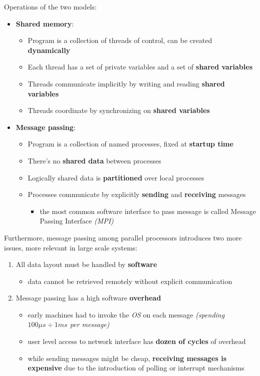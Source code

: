 \documentclass[english]{article}
\begin{document}
\bigskip
Operations of the two models:

\begin{itemize}
  \item \textbf{Shared memory}:
        \begin{itemize}
          \item Program is a collection of threads of control, can be created \textbf{dynamically}
          \item Each thread has a set of private variables and a set of \textbf{shared variables}
          \item Threads communicate implicitly by writing and reading \textbf{shared variables}
          \item Threads coordinate by synchronizing on \textbf{shared variables}
        \end{itemize}
  \item \textbf{Message passing}:
        \begin{itemize}
          \item Program is a collection of named processes, fixed at \textbf{startup time}
          \item There's no \textbf{shared data} between processes
          \item Logically shared data is \textbf{partitioned} over local processes
          \item Processes communicate by explicitly \textbf{sending} and \textbf{receiving} messages
                \begin{itemize}
                  \item the most common software interface to pass message is called Message Passing Interface \textit{(MPI)}
                \end{itemize}
        \end{itemize}
\end{itemize}

\bigskip
Furthermore, message passing among parallel processors introduces two more issues, more relevant in large scale systems:

\begin{enumerate}
  \item All data layout must be handled by \textbf{software}
        \begin{itemize}
          \item data cannot be retrieved remotely without explicit communication
        \end{itemize}
  \item Message passing has a high software \textbf{overhead}
        \begin{itemize}
          \item early machines had to invoke the \textit{OS} on each message \textit{(spending \(100\mu s \div 1ms\) per message)}
          \item user level access to network interface has \textbf{dozen of cycles} of overhead
          \item while sending messages might be cheap, \textbf{receiving messages is expensive} due to the introduction of polling or interrupt mechanisms
        \end{itemize}
\end{enumerate}
\end{document}
